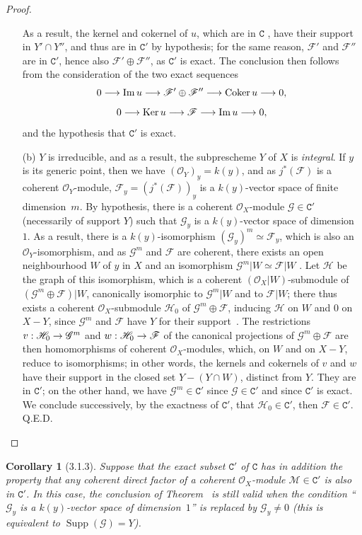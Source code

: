 \documentclass[oneside]{amsart}
\theoremstyle{ega-env-style}
\theoremstyle{ega-thm-env-style}
\newtheorem*{corollary}{Corollary}
\theoremstyle{ega-defn-env-style}
\def\mathcal{\mathscr}
\def\sh{\mathcal}                   %
\def\cat{\mathtt}                   %
\def\setmin{-}                      %
\def\kres{k}                        %
\def\C{\cat{C}}                     %
\def\Supp{\operatorname{Supp}}
\def\Ker{\operatorname{Ker}}
\def\Im{\operatorname{Im}}
\def\Coker{\operatorname{Coker}}
\renewcommand{\to}{\mathchoice{\longrightarrow}{\rightarrow}{\rightarrow}{\rightarrow}}
\def\isoto{\simeq} %
\let\EGAOriginalLabel\label
\renewcommand{\label}[1]{\phantomsection\EGAOriginalLabel{#1}}
\begin{document}
\begin{proof}
\begin{enumerate}
    As a result, the kernel and cokernel of $u$, which are in $\C$ , have their support in $Y'\cap Y''$, and thus are in $\C'$ by hypothesis; for the same reason, $\sh{F}'$ and $\sh{F}''$ are in $\C'$, hence also $\sh{F}'\oplus\sh{F}''$, as $\C'$ is exact.
    The conclusion then follows from the consideration of the two exact sequences
    \[
      0\to\Im u\to\sh{F}'\oplus\sh{F}''\to\Coker u\to 0,
    \]
    \[
      0\to\Ker u\to\sh{F}\to\Im u\to 0,
    \]
    and the hypothesis that $\C'$ is exact.
  \item[(b)] $Y$ is irreducible, and as a result, the subprescheme $Y$ of $X$ is \emph{integral}.
    If $y$ is its generic point, then we have $(\sh{O}_Y)_y=\kres(y)$, and as $j^*(\sh{F})$ is a coherent $\sh{O}_Y$-module, $\sh{F}_y=(j^*(\sh{F}))_y$ is a $\kres(y)$-vector space of finite dimension~$m$.
    By hypothesis, there is a coherent $\sh{O}_X$-module $\sh{G}\in\C'$ (necessarily of support $Y$) such that $\sh{G}_y$ is a $\kres(y)$-vector space of dimension~$1$.
    As a result, there is a $\kres(y)$-isomorphism $(\sh{G}_y)^m\isoto\sh{F}_y$, which is also an $\sh{O}_Y$-isomorphism, and as $\sh{G}^m$ and $\sh{F}$ are coherent, there exists an open neighbourhood $W$ of $y$ in $X$ and an isomorphism $\sh{G}^m|W\isoto\sh{F}|W$ .
    Let $\sh{H}$ be the graph of this isomorphism, which is a coherent $(\sh{O}_X|W)$-submodule of $(\sh{G}^m\oplus\sh{F})|W$, canonically isomorphic to $\sh{G}^m|W$ and to $\sh{F}|W$; there thus exists a coherent $\sh{O}_X$-submodule $\sh{H}_0$ of $\sh{G}^m\oplus\sh{F}$, inducing $\sh{H}$ on $W$ and $0$ on $X\setmin Y$, since $\sh{G}^m$ and $\sh{F}$ have $Y$ for their support~.
    The restrictions $v:\sh{H}_0\to\sh{G}^m$ and $w:\sh{H}_0\to\sh{F}$ of the canonical projections of $\sh{G}^m\oplus\sh{F}$ are then homomorphisms of coherent $\sh{O}_X$-modules, which, on $W$ and on $X\setmin Y$, reduce to isomorphisms; in other words, the kernels and cokernels of $v$ and $w$ have their support in the closed set $Y\setmin(Y\cap W)$, distinct from $Y$.
    They are in $\C'$; on the other hand, we have $\sh{G}^m\in\C'$ since $\sh{G}\in\C'$ and since $\C'$ is exact.
    We conclude successively, by the exactness of $\C'$, that $\sh{H}_0\in\C'$, then $\sh{F}\in\C'$.
Q.E.D.
\end{enumerate}
\end{proof}

\begin{corollary}[3.1.3]
\label{III.3.1.3}
Suppose that the exact subset $\C'$ of $\C$ has in addition the property that any coherent direct factor of a coherent $\sh{O}_X$-module $\sh{M}\in\C'$ is also in $\C'$.
In this case, the conclusion of Theorem~ is still valid when the condition ``$\sh{G}_y$ is a $\kres(y)$-vector space of dimension~$1$'' is replaced by $\sh{G}_y\neq 0$ (this is equivalent to $\Supp(\sh{G})=Y$).
\end{corollary}
\end{document}
